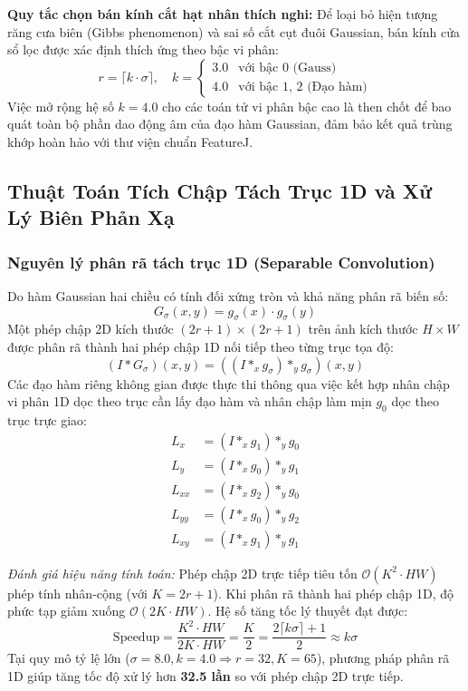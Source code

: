 \documentclass[conference]{IEEEtran}
\begin{document}
\textbf{Quy tắc chọn bán kính cắt hạt nhân thích nghi:} Để loại bỏ hiện tượng răng cưa biên (Gibbs phenomenon) và sai số cắt cụt đuôi Gaussian, bán kính cửa sổ lọc được xác định thích ứng theo bậc vi phân:
\begin{equation}
r = \lceil k \cdot \sigma \rceil, \quad k = \begin{cases} 3.0 & \text{với bậc 0 (Gauss)} \\ 4.0 & \text{với bậc 1, 2 (Đạo hàm)} \end{cases}
\end{equation}
Việc mở rộng hệ số $k=4.0$ cho các toán tử vi phân bậc cao là then chốt để bao quát toàn bộ phần dao động âm của đạo hàm Gaussian, đảm bảo kết quả trùng khớp hoàn hảo với thư viện chuẩn FeatureJ.

\subsection{Thuật Toán Tích Chập Tách Trục 1D và Xử Lý Biên Phản Xạ}
\subsubsection{Nguyên lý phân rã tách trục 1D (Separable Convolution)}
Do hàm Gaussian hai chiều có tính đối xứng tròn và khả năng phân rã biến số:
\begin{equation}
G_\sigma(x, y) = g_\sigma(x) \cdot g_\sigma(y)
\end{equation}
Một phép chập 2D kích thước $(2r+1) \times (2r+1)$ trên ảnh kích thước $H \times W$ được phân rã thành hai phép chập 1D nối tiếp theo từng trục tọa độ:
\begin{equation}
(I * G_\sigma)(x, y) = \left( (I *_x g_\sigma) *_y g_\sigma \right)(x, y)
\end{equation}
Các đạo hàm riêng không gian được thực thi thông qua việc kết hợp nhân chập vi phân 1D dọc theo trục cần lấy đạo hàm và nhân chập làm mịn $g_0$ dọc theo trục trực giao:
\begin{align}
L_x &= (I *_x g_1) *_y g_0 \label{eq:lx} \\
L_y &= (I *_x g_0) *_y g_1 \label{eq:ly} \\
L_{xx} &= (I *_x g_2) *_y g_0 \label{eq:lxx} \\
L_{yy} &= (I *_x g_0) *_y g_2 \label{eq:lyy} \\
L_{xy} &= (I *_x g_1) *_y g_1 \label{eq:lxy}
\end{align}

\textit{Đánh giá hiệu năng tính toán:} Phép chập 2D trực tiếp tiêu tốn $\mathcal{O}(K^2 \cdot HW)$ phép tính nhân-cộng (với $K = 2r+1$). Khi phân rã thành hai phép chập 1D, độ phức tạp giảm xuống $\mathcal{O}(2K \cdot HW)$. Hệ số tăng tốc lý thuyết đạt được:
\begin{equation}
\text{Speedup} = \frac{K^2 \cdot HW}{2K \cdot HW} = \frac{K}{2} = \frac{2\lceil k\sigma \rceil + 1}{2} \approx k\sigma
\end{equation}
Tại quy mô tỷ lệ lớn ($\sigma = 8.0, k = 4.0 \Rightarrow r = 32, K = 65$), phương pháp phân rã 1D giúp tăng tốc độ xử lý hơn \textbf{32.5 lần} so với phép chập 2D trực tiếp.
\end{document}
